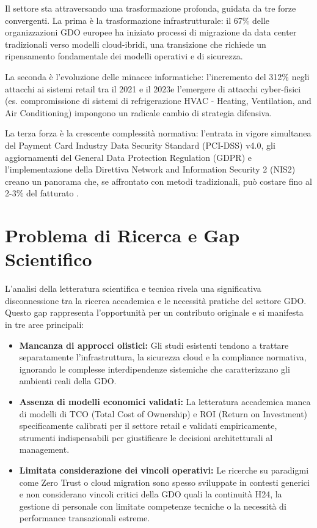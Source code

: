 \begin{refsection}
Il settore sta attraversando una trasformazione profonda, guidata da tre forze convergenti. La prima è la trasformazione infrastrutturale: il 67\% delle organizzazioni GDO europee ha iniziato processi di migrazione da data center tradizionali verso modelli cloud-ibridi\autocite{gartner2024cloud}, una transizione che richiede un ripensamento fondamentale dei modelli operativi e di sicurezza.

La seconda è l'evoluzione delle minacce informatiche: l'incremento del 312\% negli attacchi ai sistemi retail tra il 2021 e il 2023\autocite{enisa2024retail}e l'emergere di attacchi cyber-fisici (es. compromissione di sistemi di refrigerazione HVAC - Heating, Ventilation, and Air Conditioning) impongono un radicale cambio di strategia difensiva. 

La terza forza è la crescente complessità normativa: l'entrata in vigore simultanea del Payment Card Industry Data Security Standard (PCI-DSS) v4.0, gli aggiornamenti del General Data Protection Regulation (GDPR) e l'implementazione della Direttiva Network and Information Security 2 (NIS2) creano un panorama che, se affrontato con metodi tradizionali, può costare fino al 2-3\% del fatturato \autocite{ponemon2024compliance}.

\section{Problema di Ricerca e Gap Scientifico}

L'analisi della letteratura scientifica e tecnica rivela una significativa disconnessione tra la ricerca accademica e le necessità pratiche del settore GDO. Questo gap rappresenta l'opportunità per un contributo originale e si manifesta in tre aree principali:
\begin{itemize}
\item \textbf{Mancanza di approcci olistici:} Gli studi esistenti tendono a trattare separatamente l'infrastruttura, la sicurezza cloud e la compliance normativa, ignorando le complesse interdipendenze sistemiche che caratterizzano gli ambienti reali della GDO.
\item \textbf{Assenza di modelli economici validati:} La letteratura accademica manca di modelli di TCO (Total Cost of Ownership) e ROI (Return on Investment) specificamente calibrati per il settore retail e validati empiricamente, strumenti indispensabili per giustificare le decisioni architetturali al management.
\item \textbf{Limitata considerazione dei vincoli operativi: }Le ricerche su paradigmi come Zero Trust o cloud migration sono spesso sviluppate in contesti generici e non considerano vincoli critici della GDO quali la continuità H24, la gestione di personale con limitate competenze tecniche o la necessità di performance transazionali estreme.


\end{itemize}
\end{refsection}
